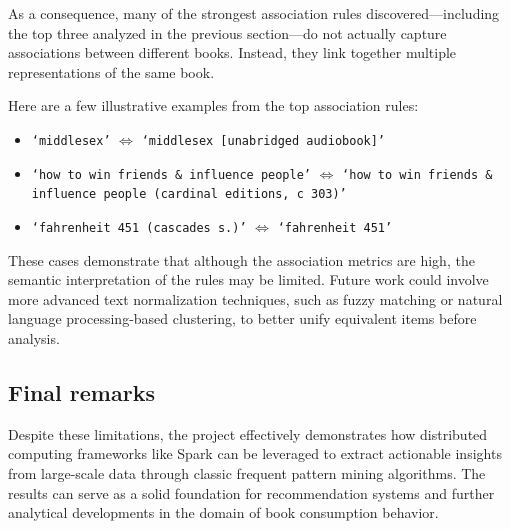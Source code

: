 \documentclass[a4paper,12pt]{article}
\begin{document}
As a consequence, many of the strongest association rules discovered—including the top three analyzed in the previous section—do not actually capture associations between different books. Instead, they link together multiple representations of the same book.

Here are a few illustrative examples from the top association rules:

\begin{itemize}
    \item \texttt{`middlesex'} $\Leftrightarrow$ \texttt{`middlesex [unabridged audiobook]'}
    \item \texttt{`how to win friends \& influence people'} $\Leftrightarrow$ \texttt{`how to win friends \& influence people (cardinal editions, c 303)'}
    \item \texttt{`fahrenheit 451 (cascades s.)'} $\Leftrightarrow$ \texttt{`fahrenheit 451'}
\end{itemize}

These cases demonstrate that although the association metrics are high, the semantic interpretation of the rules may be limited. Future work could involve more advanced text normalization techniques, such as fuzzy matching or natural language processing-based clustering, to better unify equivalent items before analysis.

\subsection{Final remarks}
Despite these limitations, the project effectively demonstrates how distributed computing frameworks like Spark can be leveraged to extract actionable insights from large-scale data through classic frequent pattern mining algorithms. The results can serve as a solid foundation for recommendation systems and further analytical developments in the domain of book consumption behavior.
\end{document}
